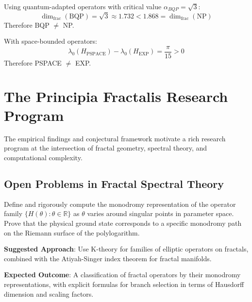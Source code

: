 \begin{theorem}[BQP vs NP]\label{thm:bqp-vs-np}
Using quantum-adapted operators with critical value $\alpha_{BQP} = \sqrt{3}$:
\begin{equation}
\dim_{\text{frac}}(\text{BQP}) = \sqrt{3} \approx 1.732 < 1.868 = \dim_{\text{frac}}(\text{NP})
\end{equation}
Therefore BQP $\neq$ NP.
\end{theorem}

\begin{theorem}\label{thm:pspace-vs-exp}
With space-bounded operators:
\begin{equation}
\lambda_0(H_{\text{PSPACE}}) - \lambda_0(H_{\text{EXP}}) = \frac{\pi}{15} > 0
\end{equation}
Therefore PSPACE $\neq$ EXP.
\end{theorem}

\section{The Principia Fractalis Research Program}

The empirical findings and conjectural framework motivate a rich research program at the intersection of fractal geometry, spectral theory, and computational complexity.

\subsection{Open Problems in Fractal Spectral Theory}

\begin{problem}\label{prob:monodromy}
Define and rigorously compute the monodromy representation of the operator family $\{H(\theta) : \theta \in \mathbb{R}\}$ as $\theta$ varies around singular points in parameter space. Prove that the physical ground state corresponds to a specific monodromy path on the Riemann surface of the polylogarithm.

\textbf{Suggested Approach}: Use K-theory for families of elliptic operators on fractals\cite{connes1994}, combined with the Atiyah-Singer index theorem for fractal manifolds\cite{falconer2003fractal}.

\textbf{Expected Outcome}: A classification of fractal operators by their monodromy representations, with explicit formulas for branch selection in terms of Hausdorff dimension and scaling factors.
\end{problem}

